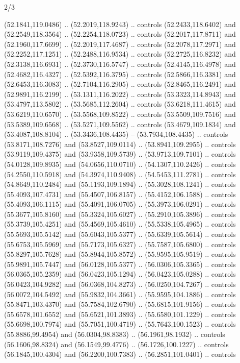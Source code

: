 \begin{flagdescription}{2/3}
\begin{scope}[shift={(0.5\flaglength,0.5)},scale=\flagwidth/320]
\begin{scope}[y=0.8pt, x=0.8pt, yscale=-1,shift={(-118.3,-146)}]
  (52.1841,119.0486) .. (52.2019,118.9243) .. controls (52.2433,118.6402) and
  (52.2549,118.3564) .. (52.2254,118.0723) .. controls (52.2017,117.8711) and
  (52.1960,117.6699) .. (52.2019,117.4687) .. controls (52.2078,117.2971) and
  (52.2252,117.1251) .. (52.2488,116.9534) .. controls (52.2725,116.8232) and
  (52.3138,116.6931) .. (52.3730,116.5747) .. controls (52.4145,116.4978) and
  (52.4682,116.4327) .. (52.5392,116.3795) .. controls (52.5866,116.3381) and
  (52.6453,116.3083) .. (52.7104,116.2905) .. controls (52.8465,116.2491) and
  (52.9891,116.2199) .. (53.1311,116.2022) .. controls (53.3323,114.8943) and
  (53.4797,113.5802) .. (53.5685,112.2604) .. controls (53.6218,111.4615) and
  (53.6219,110.6570) .. (53.5568,109.8522) .. controls (53.5509,109.7516) and
  (53.5389,109.6568) .. (53.5271,109.5562) .. controls (53.4679,109.1834) and
  (53.4087,108.8104) .. (53.3436,108.4435) -- (53.7934,108.4435) .. controls
  (53.8171,108.7276) and (53.8527,109.0114) .. (53.8941,109.2955) .. controls
  (53.9119,109.4375) and (53.9358,109.5739) .. (53.9713,109.7101) .. controls
  (54.0128,109.8935) and (54.0656,110.0710) .. (54.1307,110.2426) .. controls
  (54.2550,110.5918) and (54.3974,110.9408) .. (54.5453,111.2781) .. controls
  (54.8649,110.2484) and (55.1193,109.1894) .. (55.3028,108.1241) .. controls
  (55.4093,107.4731) and (55.4507,106.8157) .. (55.4152,106.1588) .. controls
  (55.4093,106.1115) and (55.4091,106.0705) .. (55.3973,106.0291) .. controls
  (55.3677,105.8160) and (55.3324,105.6027) .. (55.2910,105.3896) .. controls
  (55.3739,105.4251) and (55.4569,105.4610) .. (55.5338,105.4965) .. controls
  (55.5693,105.5142) and (55.6043,105.5377) .. (55.6339,105.5614) .. controls
  (55.6753,105.5969) and (55.7173,105.6327) .. (55.7587,105.6800) .. controls
  (55.8297,105.7628) and (55.8944,105.8572) .. (55.9595,105.9519) .. controls
  (55.9891,105.7447) and (56.0128,105.5377) .. (56.0306,105.3365) .. controls
  (56.0365,105.2359) and (56.0423,105.1294) .. (56.0423,105.0288) .. controls
  (56.0423,104.9282) and (56.0368,104.8273) .. (56.0250,104.7267) .. controls
  (56.0072,104.5492) and (55.9832,104.3661) .. (55.9595,104.1886) .. controls
  (55.8471,103.4370) and (55.7584,102.6790) .. (55.6815,101.9156) .. controls
  (55.6578,101.6552) and (55.6521,101.3893) .. (55.6580,101.1229) .. controls
  (55.6698,100.7974) and (55.7051,100.4719) .. (55.7643,100.1523) .. controls
  (55.8886,99.4954) and (56.0304,98.8383) .. (56.1961,98.1932) .. controls
  (56.1606,98.8324) and (56.1549,99.4776) .. (56.1726,100.1227) .. controls
  (56.1845,100.4304) and (56.2200,100.7383) .. (56.2851,101.0401) .. controls

\end{scope}
\end{scope}
\end{flagdescription}
